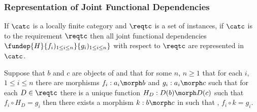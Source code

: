  
\subsubsection{Representation of Joint Functional Dependencies}
\begin{lemma}
If $\catc$ is a locally finite category and $\reqtc$ is a set of instances, if $\catc$ is 
 to the requirement $\reqtc$ then
all joint functional dependencies $\fundep{H}{f_i)_{1 \le i \leq n}}{g_i)_{1 \le i \leq n}}$  with respect to $\reqtc$ are represented in $\catc$.

Suppose that $b$ and $c$ are objects of \catcw and that for some $n$, $n \geq 1$ that for each $i$,$1\leq i \leq n$  there are morphisms $f_i: a_i \morph b$ and 
$g_i: a_i \morph c$ such that for each $D \in \reqtc$ there is a unique function
$H_{D}: D(b) \morph D(c)$ such that \foreachi $f_i \circ H_D = g_i$
then there exists a morphism $k: b \morph c$ in \catcw such that \foreachi, 
$f_i \circ k = g_i$.


\end{lemma}
